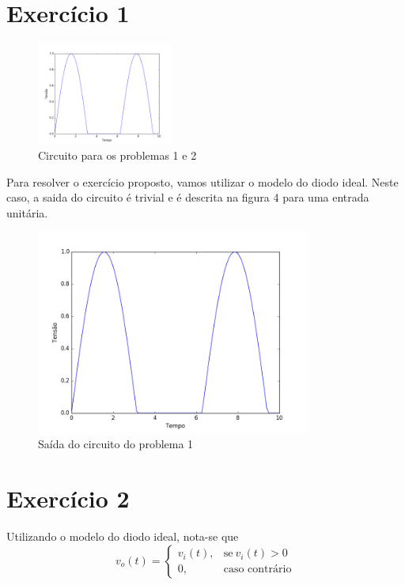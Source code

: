 \documentclass[12pt, a4paper, twoside]{article}
\begin{document}
\section{Exercício 1}

\begin{figure}
    \centering
    \includegraphics[width=0.4\textwidth]{figs/rel3/ex1.png}
    \caption{Circuito para os problemas 1 e 2}
\end{figure}

Para resolver o exercício proposto, vamos utilizar o modelo do diodo ideal. Neste caso,
a saida do circuito é trivial e é descrita na figura 4 para uma entrada unitária.

\begin{figure}
    \centering
    \includegraphics[width=0.8\textwidth]{figs/rel3/ex1.png}
    \caption{Saída do circuito do problema 1}
\end{figure}

\section{Exercício 2}

Utilizando o modelo do diodo ideal, nota-se que
\begin{equation}
    v_o(t) =
    \begin{cases}
        v_i(t), & \text{se}\ v_i(t) > 0 \\
        0, & \text{caso contrário}
    \end{cases}
\end{equation}
\end{document}
